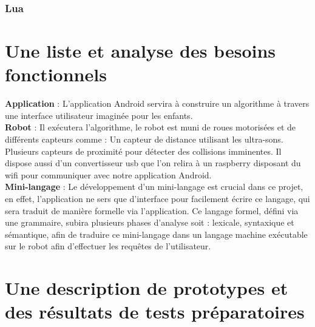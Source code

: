 \documentclass[a4paper]{article}
\begin{document}
\subsubsection{Lua}


\section{Une liste et analyse des besoins fonctionnels}
\textbf{Application} : L’application Android servira à construire un algorithme à travers une interface utilisateur imaginée pour les enfants.\\
\textbf{Robot} : Il exécutera l’algorithme, le robot est muni de roues motorisées et de différents capteurs comme :
Un capteur de distance utilisant les ultra-sons.
Plusieurs capteurs de proximité pour détecter des collisions imminentes.
Il dispose aussi d’un convertisseur usb que l’on relira à un raspberry disposant du wifi pour communiquer avec notre application Android.
\\
\textbf{Mini-langage }: Le développement d’un mini-langage est crucial dans ce projet, en effet, l’application ne sers que d’interface pour facilement écrire ce langage, qui sera traduit de manière formelle via l’application. Ce langage formel, défini via une grammaire, subira plusieurs phases d’analyse soit : lexicale, syntaxique et sémantique, afin de traduire ce mini-langage dans un langage machine exécutable sur le robot afin d’effectuer les requêtes de l’utilisateur.
\section{Une description de prototypes et des résultats de tests préparatoires}
\end{document}
